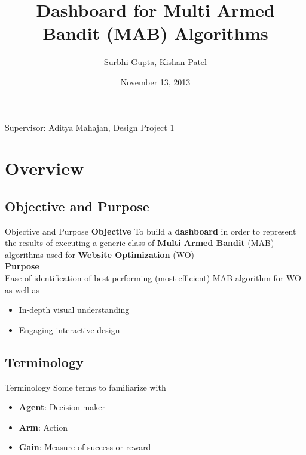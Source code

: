 \documentclass{beamer}
\begin{document}
\title[Dashboard for MAB Algorithms]{Dashboard for Multi Armed Bandit (MAB) Algorithms}
\author[Surbhi Gupta, Kishan Patel]{Surbhi Gupta, Kishan Patel}
\date{November 13, 2013}

\begin{frame}
\titlepage
\begin{center}
Supervisor: Aditya Mahajan, Design Project 1
\end{center}
\end{frame}

\begin{frame}
\tableofcontents
\end{frame}

\section{Overview}

\subsection{Objective and Purpose}
\begin{frame}{Objective and Purpose}
\textbf{Objective}
\newline To build a \textbf{dashboard} in order to represent the results of executing a generic class of \textbf{Multi Armed Bandit} (MAB) algorithms used for \textbf{Website Optimization} (WO) 
\newline
\\\textbf{Purpose}
\\Ease of identification of best performing (most efficient) MAB algorithm for WO as well as
\begin{itemize}
  \item In-depth visual understanding
  \item Engaging interactive design
\end{itemize}
\end{frame}

\subsection{Terminology}
\begin{frame}{Terminology}
Some terms to familiarize with 
\begin{itemize}
  \item \textbf{Agent}: Decision maker
  \item \textbf{Arm}: Action 
  \item \textbf{Gain}: Measure of success or reward
\end{itemize}
\end{frame}
\end{document}
